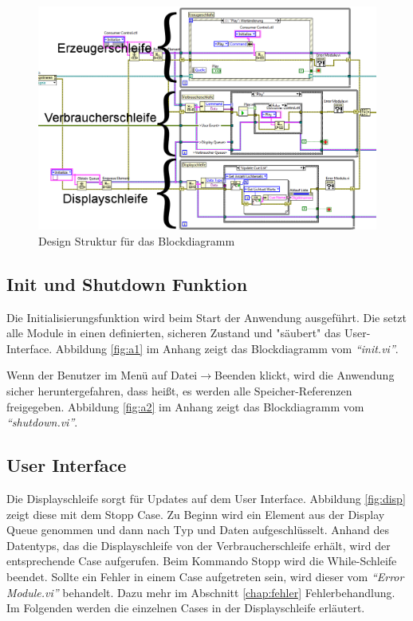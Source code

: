 	\begin{figure}%
	\centering
		\includegraphics[width=\textwidth]{Pics/ueberblick004.png}
	\caption{Design Struktur für das Blockdiagramm}
	\label{fig:schleifen}
	\end{figure}
 		

		
		

\subsection{Init und Shutdown Funktion}	%
Die Initialisierungsfunktion wird beim Start der Anwendung ausgeführt. Die setzt alle Module in einen definierten, sicheren Zustand und "säubert" das User-Interface. 
Abbildung \ref{fig:a1} im Anhang zeigt das Blockdiagramm vom \textit{"`init.vi"'}.

Wenn der Benutzer im Menü auf Datei$\rightarrow$Beenden klickt, wird die Anwendung sicher heruntergefahren, dass heißt, es werden alle Speicher-Referenzen freigegeben. 
Abbildung \ref{fig:a2} im Anhang zeigt das Blockdiagramm vom \textit{"`shutdown.vi"'}.

\subsection{User Interface}
Die Displayschleife sorgt für Updates auf dem User Interface.  Abbildung \ref{fig:disp} zeigt diese mit dem Stopp Case. Zu Beginn wird ein Element aus der Display Queue genommen
und dann nach Typ und Daten aufgeschlüsselt. 
Anhand des Datentyps, das  die Displayschleife von der Verbraucherschleife erhält, wird der entsprechende Case aufgerufen. Beim Kommando Stopp wird die While-Schleife beendet. 
Sollte ein Fehler in einem Case aufgetreten sein, wird dieser vom \textit{"`Error Module.vi"'} behandelt. Dazu mehr im Abschnitt \ref{chap:fehler} Fehlerbehandlung. 
Im Folgenden werden die einzelnen Cases in der Displayschleife erläutert.

